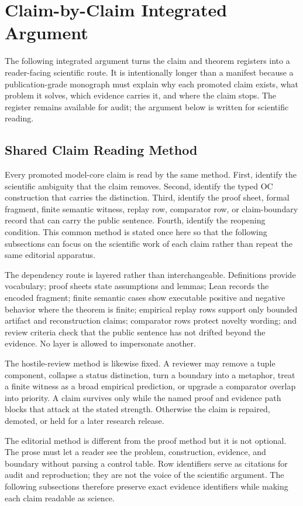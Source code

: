 \section{Claim-by-Claim Integrated Argument}
\label{sec:oc133-claim-by-claim-integrated-argument}
The following integrated argument turns the claim and theorem registers into a reader-facing scientific route. It is intentionally longer than a manifest because a publication-grade monograph must explain why each promoted claim exists, what problem it solves, which evidence carries it, and where the claim stops. The register remains available for audit; the argument below is written for scientific reading.

\subsection{Shared Claim Reading Method}
Every promoted model-core claim is read by the same method. First, identify the scientific ambiguity that the claim removes. Second, identify the typed OC construction that carries the distinction. Third, identify the proof sheet, formal fragment, finite semantic witness, replay row, comparator row, or claim-boundary record that can carry the public sentence. Fourth, identify the reopening condition. This common method is stated once here so that the following subsections can focus on the scientific work of each claim rather than repeat the same editorial apparatus.

The dependency route is layered rather than interchangeable. Definitions provide vocabulary; proof sheets state assumptions and lemmas; Lean records the encoded fragment; finite semantic cases show executable positive and negative behavior where the theorem is finite; empirical replay rows support only bounded artifact and reconstruction claims; comparator rows protect novelty wording; and review criteria check that the public sentence has not drifted beyond the evidence. No layer is allowed to impersonate another.

The hostile-review method is likewise fixed. A reviewer may remove a tuple component, collapse a status distinction, turn a boundary into a metaphor, treat a finite witness as a broad empirical prediction, or upgrade a comparator overlap into priority. A claim survives only while the named proof and evidence path blocks that attack at the stated strength. Otherwise the claim is repaired, demoted, or held for a later research release.

The editorial method is different from the proof method but it is not optional. The prose must let a reader see the problem, construction, evidence, and boundary without parsing a control table. Row identifiers serve as citations for audit and reproduction; they are not the voice of the scientific argument. The following subsections therefore preserve exact evidence identifiers while making each claim readable as science.

